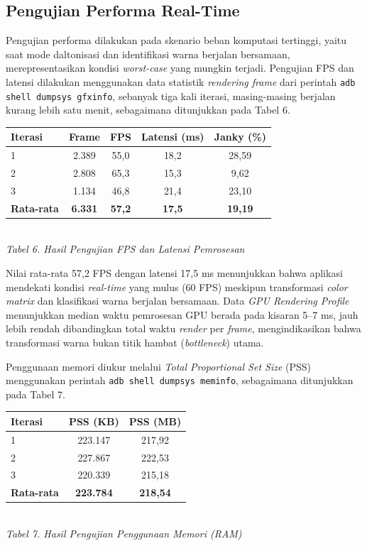 \subsection{Pengujian Performa Real-Time}

Pengujian performa dilakukan pada skenario beban komputasi tertinggi, yaitu saat mode daltonisasi dan identifikasi warna berjalan bersamaan, merepresentasikan kondisi \textit{worst-case} yang mungkin terjadi. Pengujian FPS dan latensi dilakukan menggunakan data statistik \textit{rendering frame} dari perintah \texttt{adb shell dumpsys gfxinfo}, sebanyak tiga kali iterasi, masing-masing berjalan kurang lebih satu menit, sebagaimana ditunjukkan pada Tabel 6.

\begin{table}[H]
  \centering
  {\footnotesize
  \begin{tabular}{|l|c|c|c|c|}
    \hline
    \textbf{Iterasi} & \textbf{Frame} & \textbf{FPS} & \textbf{Latensi (ms)} & \textbf{Janky (\%)} \\
    \hline
    1 & 2.389 & 55,0 & 18,2 & 28,59 \\ \hline
    2 & 2.808 & 65,3 & 15,3 & 9,62 \\ \hline
    3 & 1.134 & 46,8 & 21,4 & 23,10 \\ \hline
    \textbf{Rata-rata} & \textbf{6.331} & \textbf{57,2} & \textbf{17,5} & \textbf{19,19} \\ \hline
  \end{tabular}}\\[0.3em]
  {\footnotesize\textit{Tabel 6. Hasil Pengujian FPS dan Latensi Pemrosesan}}
\end{table}

Nilai rata-rata 57,2 FPS dengan latensi 17,5 ms menunjukkan bahwa aplikasi mendekati kondisi \textit{real-time} yang mulus (60 FPS) meskipun transformasi \textit{color matrix} dan klasifikasi warna berjalan bersamaan. Data \textit{GPU Rendering Profile} menunjukkan median waktu pemrosesan GPU berada pada kisaran 5--7 ms, jauh lebih rendah dibandingkan total waktu \textit{render} per \textit{frame}, mengindikasikan bahwa transformasi warna bukan titik hambat (\textit{bottleneck}) utama.

Penggunaan memori diukur melalui \textit{Total Proportional Set Size} (PSS) menggunakan perintah \texttt{adb shell dumpsys meminfo}, sebagaimana ditunjukkan pada Tabel 7.

\begin{table}[H]
  \centering
  {\footnotesize
  \begin{tabular}{|l|c|c|}
    \hline
    \textbf{Iterasi} & \textbf{PSS (KB)} & \textbf{PSS (MB)} \\
    \hline
    1 & 223.147 & 217,92 \\ \hline
    2 & 227.867 & 222,53 \\ \hline
    3 & 220.339 & 215,18 \\ \hline
    \textbf{Rata-rata} & \textbf{223.784} & \textbf{218,54} \\ \hline
  \end{tabular}}\\[0.3em]
  {\footnotesize\textit{Tabel 7. Hasil Pengujian Penggunaan Memori (RAM)}}
\end{table}

